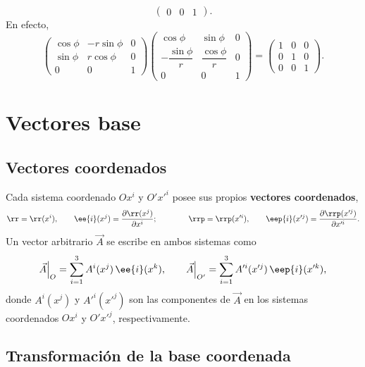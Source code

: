 \begin{ejemplo}
\begin{equation}
\begin{pmatrix}
0 & 0 & 1
\end{pmatrix}.
\end{equation}
En efecto,
\begin{equation}
\begin{pmatrix}
\cos\phi & -r\sin\phi & 0 \\
\sin\phi & r\cos\phi & 0 \\
0 & 0 & 1
\end{pmatrix}
\begin{pmatrix}
\cos\phi & \sin\phi & 0 \\
-\dfrac{\sin\phi}{r} & \dfrac{\cos\phi}{r} & 0 \\[6pt]
0 & 0 & 1
\end{pmatrix}
=
\begin{pmatrix}
1 & 0 & 0 \\
0 & 1 & 0 \\
0 & 0 & 1
\end{pmatrix}.
\end{equation}
\end{ejemplo}

\section{Vectores base}

\subsection{Vectores coordenados}

Cada sistema coordenado $Ox^i$ y $O'x'^i$ posee sus propios \textbf{vectores coordenados},
\begin{equation}
\rr = \rr(x^i), \qquad \ee{i}(x^j) = \frac{\partial \rr(x^j)}{\partial x^i};
\qquad\qquad
\rrp = \rrp(x'^i), \qquad \eep{i}(x'^j) = \frac{\partial \rrp(x'^j)}{\partial x'^i} .
\end{equation}
Un vector arbitrario $\vec A$ se escribe en ambos sistemas como
\begin{equation}
\vec A\Big|_{O} = \sum_{i=1}^{3} A^i(x^j)\,\ee{i}(x^k), \qquad
\vec A\Big|_{O'} = \sum_{i=1}^{3} A'^i(x'^j)\,\eep{i}(x'^k),
\end{equation}
donde $A^i(x^j)$ y $A'^i(x'^j)$ son las componentes de $\vec A$ en los sistemas coordenados $Ox^i$ y $O'x'^j$, respectivamente.

\subsection{Transformación de la base coordenada}

